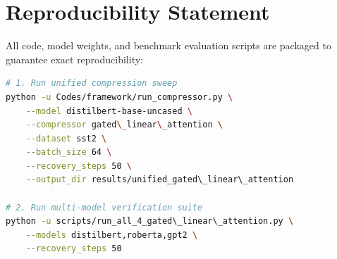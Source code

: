 \section{Reproducibility Statement}
All code, model weights, and benchmark evaluation scripts are packaged to guarantee exact reproducibility:
\begin{lstlisting}[language=bash]
# 1. Run unified compression sweep
python -u Codes/framework/run_compressor.py \
    --model distilbert-base-uncased \
    --compressor gated\_linear\_attention \
    --dataset sst2 \
    --batch_size 64 \
    --recovery_steps 50 \
    --output_dir results/unified_gated\_linear\_attention

# 2. Run multi-model verification suite
python -u scripts/run_all_4_gated\_linear\_attention.py \
    --models distilbert,roberta,gpt2 \
    --recovery_steps 50
\end{lstlisting}
